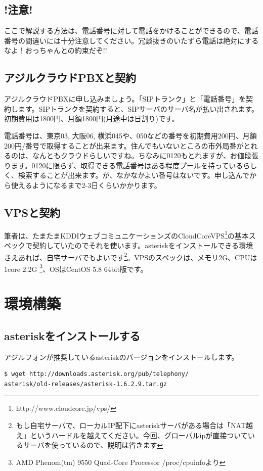 \subsection{\textbf{!注意!}}
ここで解説する方法は、電話番号に対して電話をかけることができるので、電話番号の間違いには十分注意してください。冗談抜きのいたずら電話は絶対にするなよ！おっちゃんとの約束だぞ!!

\subsection{アジルクラウドPBXと契約}
アジルクラウドPBXに申し込みましょう。「SIPトランク」と「電話番号」を契約します。SIPトランクを契約すると、SIPサーバのサーバ名が払い出されます。初期費用は1800円、月額1800円(月途中は日割り)です。

電話番号は、東京03, 大阪06, 横浜045や、050などの番号を初期費用200円、月額200円/番号で取得することが出来ます。住んでもいないところの市外局番がとれるのは、なんともクラウドらしいですね。ちなみに0120もとれますが、お値段張ります。0120に限らず、取得できる電話番号はある程度プールを持っているらしく、検索することが出来ます。が、なかなかよい番号はないです。申し込んでから使えるようになるまで2-3日くらいかかります。

\subsection{VPSと契約}
筆者は、たまたまKDDIウェブコミュニケーションズのCloudCoreVPS\footnote{http://www.cloudcore.jp/vps/}の基本スペックで契約していたのでそれを使います。asteriskをインストールできる環境さえあれば、自宅サーバでもよいです\footnote{もし自宅サーバで、ローカルIP配下にasteriskサーバがある場合は「NAT越え」というハードルを越えてください。今回、グローバルipが直接ついているサーバを使っているので、説明は省きます}。VPSのスペックは、メモリ2G、CPUは1core 2.2G \footnote{AMD Phenom(tm) 9550 Quad-Core Processor /proc/cpuinfoより}、OSはCentOS 5.8 64bit版です。

\section{環境構築}
\subsection{asteriskをインストールする}
アジルフォンが推奨しているasteriskのバージョンをインストールします。

\begin{lstlisting}[language=bash]
$ wget http://downloads.asterisk.org/pub/telephony/
asterisk/old-releases/asterisk-1.6.2.9.tar.gz
\end{lstlisting}

